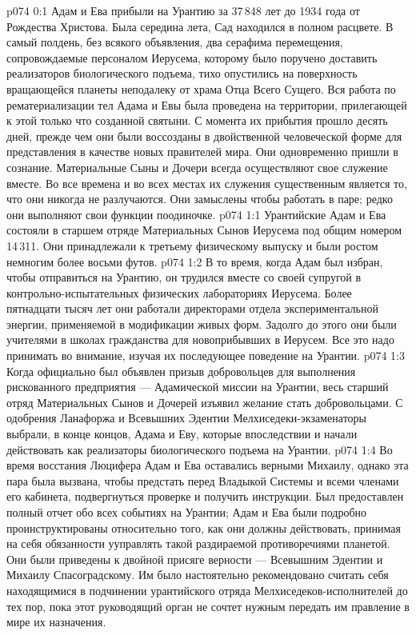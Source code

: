 \vs p074 0:1 Адам и Ева прибыли на Урантию за 37\,848 лет до 1934 года от Рождества Христова. Была середина лета, Сад находился в полном расцвете. В самый полдень, без всякого объявления, два серафима перемещения, сопровождаемые персоналом Иерусема, которому было поручено доставить реализаторов биологического подъема, тихо опустились на поверхность вращающейся планеты неподалеку от храма Отца Всего Сущего. Вся работа по рематериализации тел Адама и Евы была проведена на территории, прилегающей к этой только что созданной святыни. С момента их прибытия прошло десять дней, прежде чем они были воссозданы в двойственной человеческой форме для представления в качестве новых правителей мира. Они одновременно пришли в сознание. Материальные Сыны и Дочери всегда осуществляют свое служение вместе. Во все времена и во всех местах их служения существенным является то, что они никогда не разлучаются. Они замыслены чтобы работать в паре; редко они выполняют свои функции поодиночке.
\vs p074 1:1 Урантийские Адам и Ева состояли в старшем отряде Материальных Сынов Иерусема под общим номером 14\,311. Они принадлежали к третьему физическому выпуску и были ростом немногим более восьми футов.
\vs p074 1:2 В то время, когда Адам был избран, чтобы отправиться на Урантию, он трудился вместе со своей супругой в контрольно\hyp{}испытательных физических лабораториях Иерусема. Более пятнадцати тысяч лет они работали директорами отдела экспериментальной энергии, применяемой в модификации живых форм. Задолго до этого они были учителями в школах гражданства для новоприбывших в Иерусем. Все это надо принимать во внимание, изучая их последующее поведение на Урантии.
\vs p074 1:3 Когда официально был объявлен призыв добровольцев для выполнения рискованного предприятия --- Адамической миссии на Урантии, весь старший отряд Материальных Сынов и Дочерей изъявил желание стать добровольцами. С одобрения Ланафоржа и Всевышних Эдентии Мелхиседеки\hyp{}экзаменаторы выбрали, в конце концов, Адама и Еву, которые впоследствии и начали действовать как реализаторы биологического подъема на Урантии.
\vs p074 1:4 Во время восстания Люцифера Адам и Ева оставались верными Михаилу, однако эта пара была вызвана, чтобы предстать перед Владыкой Системы и всеми членами его кабинета, подвергнуться проверке и получить инструкции. Был предоставлен полный отчет обо всех событиях на Урантии; Адам и Ева были подробно проинструктированы относительно того, как они должны действовать, принимая на себя обязанности ууправлять такой раздираемой противоречиями планетой. Они были приведены к двойной присяге верности --- Всевышним Эдентии и Михаилу Спасоградскому. Им было настоятельно рекомендовано считать себя находящимися в подчинении урантийского отряда Мелхиседеков\hyp{}исполнителей до тех пор, пока этот руководящий орган не сочтет нужным передать им правление в мире их назначения.
